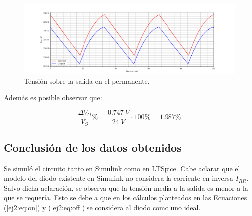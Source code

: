 \begin{figure}[H]
	\centering
	\includegraphics[width=\linewidth]{ImagenesEjercicio-2/vout.png}
	\caption{Tensión sobre la salida en el permanente.}
	\label{fig:ej2:vout}
\end{figure}

Además es posible observar que:

\begin{equation*}
\frac{\Delta V_O}{V_O} \% = \frac{0.747 \ V}{24 \ V} \cdot 100 \% = 1.987 \%
\end{equation*}

\subsection{Conclusión de los datos obtenidos}

Se simuló el circuito tanto en Simulink como en LTSpice. Cabe aclarar que el modelo del diodo existente en Simulink no considera la corriente en inversa $I_{RR}$. Salvo dicha aclaración, se observa que la tensión media a la salida es menor a la que se requería. Esto se debe a que en los cálculos planteados en las Ecuaciones (\ref{ej2:eq:on}) y (\ref{ej2:eq:off}) se considera al diodo como uno ideal. 

